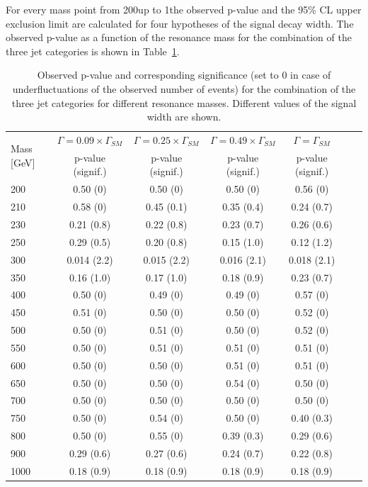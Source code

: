 For every mass point from 200\GeV up to 1\TeV the observed p-value and the 95\% CL upper exclusion limit are calculated for four hypotheses of the signal decay width. The observed p-value as a function of the resonance mass for the combination of the three jet categories is shown in Table~\ref{tab:significance}.

\begin{table}[htb]
\small{
\begin{center}
\caption{Observed p-value and corresponding significance (set to 0 in case of underfluctuations of the observed number of events) for the combination of the three jet categories for different resonance masses. Different values of the signal width are shown.\label{tab:significance}}
\begin{tabular}{lcccccc}
\toprule
\multirow{2}{*}{Mass [GeV]}            & $\Gamma = 0.09 \times \Gamma_{SM}$ & $\Gamma = 0.25 \times \Gamma_{SM}$ & $\Gamma = 0.49 \times \Gamma_{SM}$ & $\Gamma = \Gamma_{SM}$\\
                                          & p-value (signif.)  & p-value (signif.)  & p-value (signif.)  & p-value (signif.) \\
\midrule
200 &  0.50 (0)   & 0.50 (0)    & 0.50 (0) & 0.56 (0)\\
210 &  0.58 (0)   & 0.45 (0.1) & 0.35 (0.4) & 0.24 (0.7)\\
230 &  0.21 (0.8) & 0.22 (0.8) & 0.23 (0.7) & 0.26 (0.6)\\
250 &  0.29 (0.5) & 0.20 (0.8)  & 0.15 (1.0) & 0.12 (1.2)\\
300 &  0.014 (2.2)& 0.015 (2.2)& 0.016 (2.1) & 0.018 (2.1)\\
350 &  0.16 (1.0) & 0.17 (1.0) & 0.18 (0.9) & 0.23 (0.7)\\
400 &  0.50 (0)   & 0.49 (0)   & 0.49 (0) & 0.57 (0)\\
450 &  0.51 (0)   & 0.50 (0)   & 0.50 (0) & 0.52 (0)\\
500 &  0.50 (0)   & 0.51 (0)   & 0.50 (0) & 0.52 (0)\\
550 &  0.50 (0)   & 0.51 (0)   & 0.51 (0) & 0.51 (0)\\
600 &  0.50 (0)   & 0.50 (0)   & 0.51 (0) & 0.51 (0)\\
650 &  0.50 (0)   & 0.50 (0)   & 0.54 (0) & 0.50 (0)\\
700 &  0.50 (0)   & 0.50 (0)   & 0.50 (0) & 0.50 (0)\\
750 &  0.50 (0)   & 0.54 (0)   & 0.50 (0) & 0.40 (0.3)\\
800 &  0.50 (0)   & 0.55 (0)   & 0.39 (0.3) & 0.29 (0.6)\\
900 &  0.29 (0.6) & 0.27 (0.6) & 0.24 (0.7) & 0.22 (0.8)\\
1000 & 0.18 (0.9) & 0.18 (0.9) & 0.18 (0.9) & 0.18 (0.9)\\
\bottomrule
\end{tabular}
\end{center}
}
\end{table}

